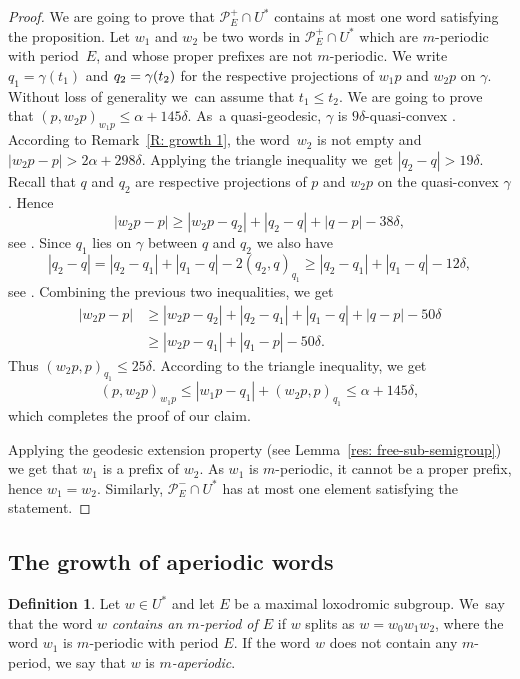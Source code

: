 \documentclass[11pt]{article}
\newcommand{\Subsection}{\subsection}
\let\mathcal\mathscr
\theoremstyle{plain}
\theoremstyle{definition}
\newtheorem{df}[thm]{Definition}
\begin{document}
\begin{proof}
We are going to prove that $\mathcal P^+_E \cap U^*$ contains at most one word satisfying the proposition.
Let $w_1$ and $w_2$ be two words in $\mathcal P^+_E \cap U^*$ which are $m$-periodic with period~$E$, and whose proper prefixes are not $m$-periodic.
We write $q_1 = \gamma(t_1)$ and $q_2 =\nobreak \gamma(t_2)$ for the respective projections of $w_1p$ and $w_2p$ on $\gamma$.
Without loss of generality we~can assume that $t_1 \leq t_2$.
We are going to prove that $(p, w_2p)_{w_1p} \leq \alpha + 145\delta$.
As~a quasi-geodesic, $\gamma$ is $9\delta$-quasi-convex \cite[Cor.\,2.7(2)]{coulon_geometry_2014}.
According to Remark~\ref{R: growth 1}, the word~$w_2$ is not empty and $|w_2p - p| > 2\alpha + 298\delta$.
Applying the triangle inequality we~get $|q_2-q| > 19\delta$.
Recall that $q$ and $q_2$ are respective projections of $p$ and $w_2p$ on the quasi-convex $\gamma$.
Hence
\begin{equation*}
|w_2p - p| \geq |w_2p - q_2| + |q_2 - q| + |q - p| - 38\delta,
\end{equation*}
see \cite[Cor.\,2.12(2)]{coulon_geometry_2014}.
Since $q_1$ lies on $\gamma$ between $q$ and $q_2$ we also have
\begin{equation*}
|q_2 - q| = |q_2 - q_1| + |q_1 - q| - 2(q_2,q)_{q_1}
\geq |q_2 - q_1| + |q_1 - q| - 12\delta,
\end{equation*}
see \cite[Cor.\,2.7(1)]{coulon_geometry_2014}.
Combining the previous two inequalities, we get
\begin{align*}
|w_2p - p| & \geq |w_2p - q_2| + |q_2 - q_1| + |q_1 - q| + |q - p| - 50\delta \\
& \geq |w_2p - q_1| + |q_1 - p| - 50\delta.
\end{align*}
Thus $(w_2p,p)_{q_1} \leq 25\delta$.
According to the triangle inequality, we get
\begin{equation*}
(p, w_2p)_{w_1p} \leq |w_1p - q_1| + (w_2p,p)_{q_1} \leq \alpha + 145\delta,
\end{equation*}
which completes the proof of our claim.

Applying the geodesic extension property (see Lemma~\ref{res: free-sub-semigroup}) we get that $w_1$ is a prefix of $w_2$.
As $w_1$ is $m$-periodic, it cannot be a proper prefix, hence $w_1 = w_2$.
Similarly, $\mathcal P^-_E \cap U^*$ has at most one element satisfying the statement.
\end{proof}

\Subsection{The growth of aperiodic words}

\begin{df} Let $w\in U^*$ and let $E$ be a maximal loxodromic subgroup.
We~say that the word $w$ \emph{contains an $m$-period of $E$} if $w$ splits as $w=w_0w_1w_2$, where the word $w_1$ is $m$-periodic with period $E$.
If the word $w$ does not contain any $m$-period, we say that $w$ is \emph{$m$-aperiodic}.
\end{df}
\end{document}
